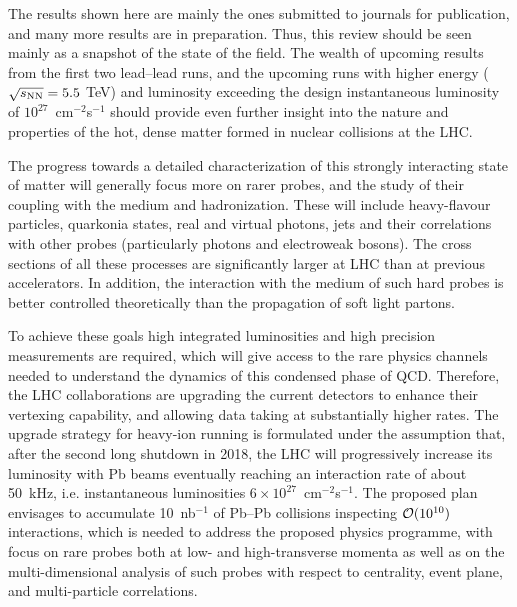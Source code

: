The results shown here are mainly the ones submitted to journals for publication, and many more
results are in preparation.  Thus, this review should be seen mainly as a snapshot of
the state of the field.  The wealth of upcoming results from the first two lead--lead runs,
and the upcoming runs with higher energy ($\mbox{$\sqrt{s_{\mathrm{NN}}}$} = 5.5$ TeV) and luminosity
exceeding the design instantaneous luminosity of $10^{27}$~cm$^{-2}$s$^{-1}$ should
provide even further insight into
the nature and properties of the hot, dense matter formed in nuclear collisions at the LHC.

The progress towards a detailed characterization of this strongly
interacting state of matter will generally focus more on rarer probes,
and the study of their coupling with the medium and
hadronization. These will include heavy-flavour particles, quarkonia
states, real and virtual photons, jets and their correlations with
other probes (particularly photons and electroweak bosons).  The cross
sections of all these processes are significantly larger at LHC than
at previous accelerators. In addition, the interaction with the medium
of such hard probes is better controlled theoretically than the
propagation of soft light partons.

To achieve these goals high integrated luminosities and high precision measurements
are required, which will give access to the rare physics channels
needed to understand the dynamics of this condensed phase of QCD.
Therefore, the LHC collaborations are upgrading the current
detectors to enhance their vertexing capability, and allowing data
taking at substantially higher rates.  The upgrade strategy for
heavy-ion running is formulated under the assumption that, after the
second long shutdown in 2018, the LHC will progressively increase its
luminosity with Pb beams eventually reaching an interaction rate of
about 50~kHz, i.e. instantaneous luminosities $6 \times
10^{27}$~cm$^{-2}$s$^{-1}$. The proposed plan~\cite{ALICEUpgradeLoI}
envisages to accumulate 10~nb$^{-1}$ of Pb--Pb collisions inspecting
${\cal O}(10^{10})$ interactions, which is needed to address the
proposed physics programme, with focus on rare probes both at low- and
high-transverse momenta as well as on the multi-dimensional analysis
of such probes with respect to centrality, event plane, and
multi-particle correlations.
